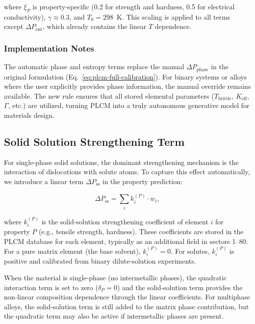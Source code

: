 \documentclass[12pt,a4paper]{article}
\begin{document}
	where $\xi_P$ is property‑specific (0.2 for strength and hardness, 0.5 for electrical conductivity), $\gamma \approx 0.3$, and $T_0 = 298$~K. This scaling is applied to all terms except $\Delta P_{\text{ent}}$, which already contains the linear $T$ dependence.
	
	\subsubsection{Implementation Notes}
	The automatic phase and entropy terms replace the manual $\Delta P_{\text{phase}}$ in the original formulation (Eq.~\ref{eq:plcm-full-calibration}). For binary systems or alloys where the user explicitly provides phase information, the manual override remains available. The new rule ensures that all stored elemental parameters ($T_{\text{brittle}}$, $K_{\text{eff}}$, $\Gamma$, etc.) are utilized, turning PLCM into a truly autonomous generative model for materials design.
	
	\subsection{Solid Solution Strengthening Term}
	\label{subsec:ss-term}
	
	For single-phase solid solutions, the dominant strengthening mechanism is the interaction of dislocations with solute atoms. To capture this effect automatically, we introduce a linear term $\Delta P_{\text{ss}}$ in the property prediction:
	
	\begin{equation}
		\Delta P_{\text{ss}} = \sum_i k_i^{(P)} \cdot w_i,
		\label{eq:ss-term}
	\end{equation}
	
	where $k_i^{(P)}$ is the solid‑solution strengthening coefficient of element $i$ for property $P$ (e.g., tensile strength, hardness). These coefficients are stored in the PLCM database for each element, typically as an additional field in sectors 1–80. For a pure matrix element (the base solvent), $k_i^{(P)} = 0$. For solutes, $k_i^{(P)}$ is positive and calibrated from binary dilute‑solution experiments.
	
	When the material is single‑phase (no intermetallic phases), the quadratic interaction term is set to zero ($\delta_P = 0$) and the solid‑solution term provides the non‑linear composition dependence through the linear coefficients. For multiphase alloys, the solid‑solution term is still added to the matrix phase contribution, but the quadratic term may also be active if intermetallic phases are present.
	
\end{document}
